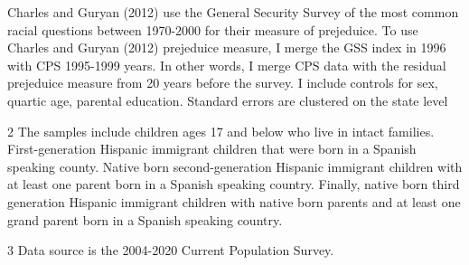 \begin{table}[!h]
{\begin{threeparttable}
\begin{tablenotes}
{                      Charles and Guryan (2012) use the General Security Survey of the most common racial questions between 1970-2000 for their measure of prejeduice.
                      To use Charles and Guryan (2012) prejeduice measure, I merge the GSS index in 1996 with CPS 1995-1999 years. 
                      In other words, I merge CPS data with the residual prejeduice measure from 20 years before the survey.
                      I include controls for sex, quartic age, parental education.
                      Standard errors are clustered on the state level}
\item[2] \footnotesize{The samples include children ages 17 and below who live in intact families. 
                      First-generation Hispanic immigrant children that were born in a 
                      Spanish speaking county. Native born second-generation Hispanic 
                      immigrant children with at least one parent born in a Spanish speaking 
                      country. Finally, native born third generation Hispanic immigrant children 
                      with native born parents and at least one grand parent born in a Spanish 
                      speaking country.}
\item[3] \footnotesize{Data source is the 2004-2020 Current Population Survey.}
\end{tablenotes}
\end{threeparttable}}
\end{table}
